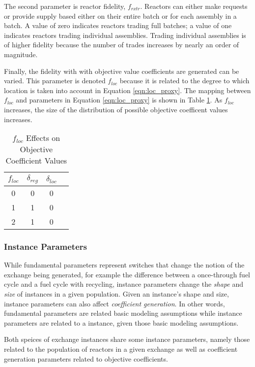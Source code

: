 The second parameter is reactor fidelity, $f_{rxtr}$. Reactors can either make
requests or provide supply based either on their entire batch or for each
assembly in a batch. A value of zero indicates reactors trading full batches; a
value of one indicates reactors trading individual assemblies. Trading
individual assemblies is of higher fidelity because the number of trades
increases by nearly an order of magnitude.

Finally, the fidelity with with objective value coefficients are generated can
be varied. This parameter is denoted $f_{loc}$ because it is related to the
degree to which location is taken into account in Equation
\ref{eqn:loc_proxy}. The mapping between $f_{loc}$ and parameters in Equation
\ref{eqn:loc_proxy} is shown in Table \ref{tbl:floc}. As $f_{loc}$ increases,
the size of the distribution of possible objective coefficent values increases.

\begin{table}[h]
\centering
\caption{$f_{loc}$ Effects on Objective Coefficient Values}
\label{tbl:floc}
\begin{tabular}{|c|c|c|c|}
\hline
$f_{loc}$ & $\delta_{reg}$ & $\delta_{loc}$ \\ \hline
0  & 0          & 0 \\ \hline
1   & 1          & 0 \\ \hline
2   & 1          & 0 \\ \hline
\end{tabular}
\end{table}

\subsubsection{Instance Parameters}

While fundamental parameters represent switches that change the notion of the
exchange being generated, for example the difference between a once-through fuel
cycle and a fuel cycle with recycling, instance parameters change the
\textit{shape} and \textit{size} of instances in a given population. Given an
instance's shape and size, instance parameters can also affect
\textit{coefficient generation}. In other words, fundamental parameters are
related basic modeling assumptions while instance parameters are related to a
instance, given those basic modeling assumptions.

Both speices of exchange instances share some instance parameters, namely those
related to the population of reactors in a given exchange as well as coefficient
generation parameters related to objective coefficients. 

